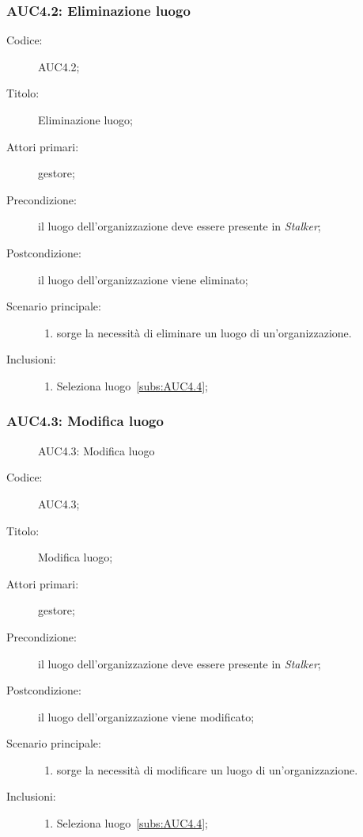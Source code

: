 \subsubsection{AUC4.2: Eliminazione luogo}%
\label{subs:AUC4.2}
\begin{description}
  \item[Codice:] AUC4.2;
  \item[Titolo:] Eliminazione luogo;
  \item[Attori primari:] gestore;
  \item[Precondizione:] il luogo dell'organizzazione deve essere presente in \emph{Stalker};
  \item[Postcondizione:] il luogo dell'organizzazione viene eliminato;
  \item[Scenario principale:]
  \begin{enumerate}
    \item sorge la necessità di eliminare un luogo di un'organizzazione.
  \end{enumerate}
  \item[Inclusioni:]
  \begin{enumerate}
    \item Seleziona luogo~\ref{subs:AUC4.4};
  \end{enumerate}
\end{description}

\subsubsection{AUC4.3: Modifica luogo}%
\label{subs:AUC4.3}

\begin{figure}[H]
  \centering
  \caption{AUC4.3: Modifica luogo}%
  \label{fig:AUC3_3_3_3}
\end{figure}

\begin{description}
  \item[Codice:] AUC4.3;
  \item[Titolo:] Modifica luogo;
  \item[Attori primari:] gestore;
  \item[Precondizione:] il luogo dell'organizzazione deve essere presente in \emph{Stalker};
  \item[Postcondizione:] il luogo dell'organizzazione viene modificato;
  \item[Scenario principale:]
  \begin{enumerate}
    \item sorge la necessità di modificare un luogo di un'organizzazione.
  \end{enumerate}
  \item[Inclusioni:]
  \begin{enumerate}
    \item Seleziona luogo~\ref{subs:AUC4.4};
  \end{enumerate}
\end{description}

